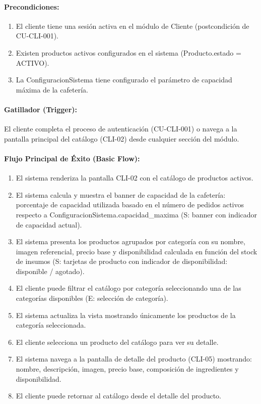 \paragraph{Precondiciones:}
\begin{enumerate}
    \item[I.] El cliente tiene una sesión activa en el módulo de Cliente (postcondición de CU-CLI-001).
    \item[II.] Existen productos activos configurados en el sistema (Producto.estado = ACTIVO).
    \item[III.] La ConfiguracionSistema tiene configurado el parámetro de capacidad máxima de la cafetería.
\end{enumerate}

\paragraph{Gatillador (Trigger):} El cliente completa el proceso de autenticación (CU-CLI-001) o navega a la pantalla principal del catálogo (CLI-02) desde cualquier sección del módulo.

\paragraph{Flujo Principal de Éxito (Basic Flow):}
\begin{enumerate}
    \item[I.] El sistema renderiza la pantalla CLI-02 con el catálogo de productos activos.
    \item[II.] El sistema calcula y muestra el banner de capacidad de la cafetería: porcentaje de capacidad utilizada basado en el número de pedidos activos respecto a ConfiguracionSistema.capacidad\_maxima (S: banner con indicador de capacidad actual).
    \item[III.] El sistema presenta los productos agrupados por categoría con su nombre, imagen referencial, precio base y disponibilidad calculada en función del stock de insumos (S: tarjetas de producto con indicador de disponibilidad: disponible / agotado).
    \item[IV.] El cliente puede filtrar el catálogo por categoría seleccionando una de las categorías disponibles (E: selección de categoría).
    \item[V.] El sistema actualiza la vista mostrando únicamente los productos de la categoría seleccionada.
    \item[VI.] El cliente selecciona un producto del catálogo para ver su detalle.
    \item[VII.] El sistema navega a la pantalla de detalle del producto (CLI-05) mostrando: nombre, descripción, imagen, precio base, composición de ingredientes y disponibilidad.
    \item[VIII.] El cliente puede retornar al catálogo desde el detalle del producto.
\end{enumerate}

